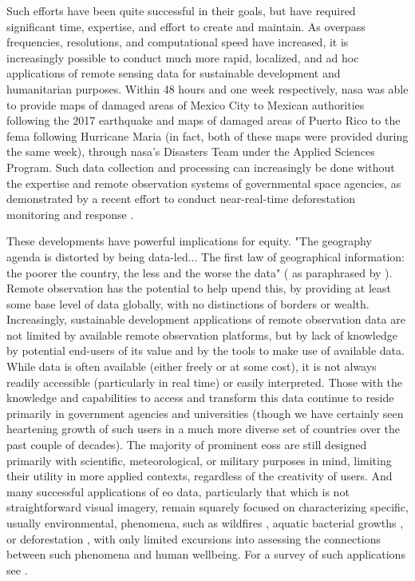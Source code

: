 Such efforts have been quite successful in their goals, but have required significant time, expertise, and effort to create and maintain. As overpass frequencies, resolutions, and computational speed have increased, it is increasingly possible to conduct much more rapid, localized, and ad hoc applications of remote sensing data for sustainable development and humanitarian purposes. Within 48 hours and one week respectively, \ac{nasa} was able to provide maps of damaged areas of Mexico City to Mexican authorities following the 2017 earthquake \cite{nasajetpropulsionlaboratorySatelliteRadarDetects2017} and maps of damaged areas of Puerto Rico to the \ac{fema} following Hurricane Maria \cite{nasajetpropulsionlaboratorySatelliteDataPuerto2017} (in fact, both of these maps were provided during the same week), through \ac{nasa}'s Disasters Team under the Applied Sciences Program. Such data collection and processing can increasingly be done without the expertise and remote observation systems of governmental space agencies, as demonstrated by a recent effort to conduct near-real-time deforestation monitoring and response \cite{finerCombatingDeforestationSatellite2018}.

These developments have powerful implications for equity. "The geography agenda is distorted by being data-led... The first law of geographical information: the poorer the country, the less and the worse the data"  (\cite{overton1991further} as paraphrased by \cite{taylorGeographicInformationSystems1994}). Remote observation has the potential to help upend this, by providing at least some base level of data globally, with no distinctions of borders or wealth. Increasingly, sustainable development applications of remote observation data are not limited by available remote observation platforms, but by lack of knowledge by potential end-users of its value and by the tools to make use of available data. While data is often available (either freely or at some cost), it is not always readily accessible (particularly in real time) or easily interpreted. Those with the knowledge and capabilities to access and transform this data continue to reside primarily in government agencies and universities (though we have certainly seen heartening growth of such users in a much more diverse set of countries over the past couple of decades). The majority of prominent \acp{eos} are still designed primarily with scientific, meteorological, or military purposes in mind, limiting their utility in more applied contexts, regardless of the creativity of users. And many successful applications of \ac{eo} data, particularly that which is not straightforward visual imagery, remain squarely focused on characterizing specific, usually environmental, phenomena, such as wildfires \cite{schroederNewVIIRS375m2014},  aquatic bacterial growths \cite{stromingQuantifyingHumanHealth2020}, or deforestation \cite{lagomasinoMeasuringMangroveCarbon2019}, with only limited excursions into assessing the connections between such phenomena and human wellbeing. For a survey of such applications see \cite{southernhemispheresummerspaceprogram2013CommonHorizonsWhite2013}.

